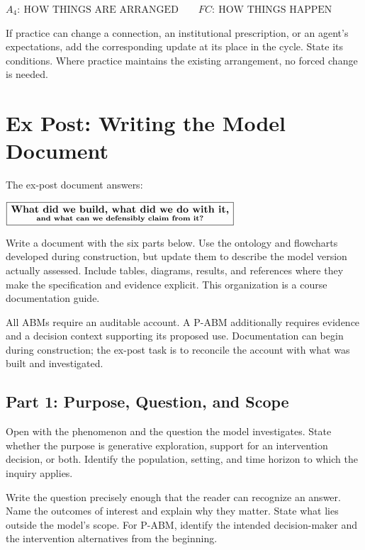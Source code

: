 \documentclass[11pt,a4paper]{article}
\newenvironment{fitdisplay}{\par\medskip\noindent\begin{lrbox}{\displaybox}$\displaystyle}{%
$\end{lrbox}\makebox[\linewidth][c]{\ifdim\wd\displaybox>\linewidth\resizebox{\linewidth}{!}{\usebox{\displaybox}}\else\usebox{\displaybox}\fi}\par\medskip}
\begin{document}
\begin{fitdisplay}
\boxed{A_4:\ \text{HOW THINGS ARE ARRANGED}\qquad FC:\ \text{HOW THINGS HAPPEN}}
\end{fitdisplay}

If practice can change a connection, an institutional prescription, or an agent's expectations, add the corresponding update at its place in the cycle. State its conditions. Where practice maintains the existing arrangement, no forced change is needed.

\clearpage


\section{Ex Post: Writing the Model Document}

The ex-post document answers:
\begin{fitdisplay}
\boxed{\textbf{What did we build, what did we do with it,}\atop\textbf{and what can we defensibly claim from it?}}
\end{fitdisplay}

Write a document with the six parts below. Use the ontology and flowcharts developed during construction, but update them to describe the model version actually assessed. Include tables, diagrams, results, and references where they make the specification and evidence explicit. This organization is a course documentation guide.

All ABMs require an auditable account. A P-ABM additionally requires evidence and a decision context supporting its proposed use. Documentation can begin during construction; the ex-post task is to reconcile the account with what was built and investigated.

\subsection{Part 1: Purpose, Question, and Scope}

Open with the phenomenon and the question the model investigates. State whether the purpose is generative exploration, support for an intervention decision, or both. Identify the population, setting, and time horizon to which the inquiry applies.

Write the question precisely enough that the reader can recognize an answer. Name the outcomes of interest and explain why they matter. State what lies outside the model's scope. For P-ABM, identify the intended decision-maker and the intervention alternatives from the beginning.
\end{document}
